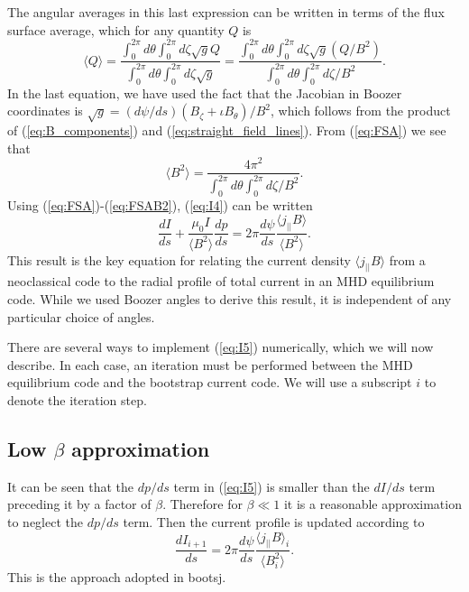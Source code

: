 \documentclass[11pt,letter]{article}
\newcommand{\bootsj}{{\ttfamily bootsj}}
\begin{document}
The angular averages in this last expression can be written in terms of the flux surface average, which for any quantity $Q$
is
\begin{equation}
\langle Q \rangle
= \frac{ \int_0^{2\pi}d\theta \int_0^{2\pi} d\zeta \sqrt{g} Q}{ \int_0^{2\pi}d\theta \int_0^{2\pi} d\zeta \sqrt{g}}
=\frac{ \int_0^{2\pi}d\theta \int_0^{2\pi} d\zeta \sqrt{g} (Q/B^2)}{ \int_0^{2\pi}d\theta \int_0^{2\pi} d\zeta /B^2}.
\label{eq:FSA}
\end{equation}
In the last equation, we have used the fact that the Jacobian in Boozer coordinates is $\sqrt{g} = (d\psi / ds) (B_\zeta + \iota B_\theta) / B^2$,
which follows from the product of (\ref{eq:B_components}) and (\ref{eq:straight_field_lines}).
From (\ref{eq:FSA}) we see that
\begin{equation}
\langle B^2 \rangle = \frac{ 4 \pi^2}{ \int_0^{2\pi}d\theta \int_0^{2\pi} d\zeta /B^2}.
\label{eq:FSAB2}
\end{equation}
Using (\ref{eq:FSA})-(\ref{eq:FSAB2}), (\ref{eq:I4}) can be written
\begin{equation}
\boxed{
 \frac{dI}{ds} 
 +\frac{\mu_0 I}{\langle B^2 \rangle}
\frac{dp}{ds} 
 =
2\pi
\frac{d\psi}{ds}
\frac{ \langle j_{||} B \rangle} {\langle B^2 \rangle}.
}
\label{eq:I5}
\end{equation}
This result is the key equation for relating
the current density $\langle j_{||} B \rangle$ from a neoclassical code to the radial profile 
of total current in an MHD equilibrium code.
While we used Boozer angles to derive this result,%
it is independent of any particular choice of angles.

There are several ways to implement (\ref{eq:I5}) numerically, which we will now describe.
In each case, an iteration must be performed between the MHD equilibrium code and the bootstrap current code.
We will use a subscript $i$ to denote the iteration step.

\subsection{Low $\beta$ approximation}
It can be seen that the $dp/ds$ term in (\ref{eq:I5}) is smaller than the $dI/ds$ term preceding it by a factor of $\beta$.
Therefore for $\beta\ll 1$ it is a reasonable approximation to neglect the $dp/ds$ term. Then
the current profile is updated according to
\begin{equation}
 \frac{dI_{i+1}}{ds} 
 =
2\pi
\frac{d\psi}{ds}
\frac{ \langle j_{||} B \rangle_i} {\langle B_i^2 \rangle}.
\label{eq:iteration_low_beta}
\end{equation}
This is the approach adopted in \bootsj.
\end{document}

